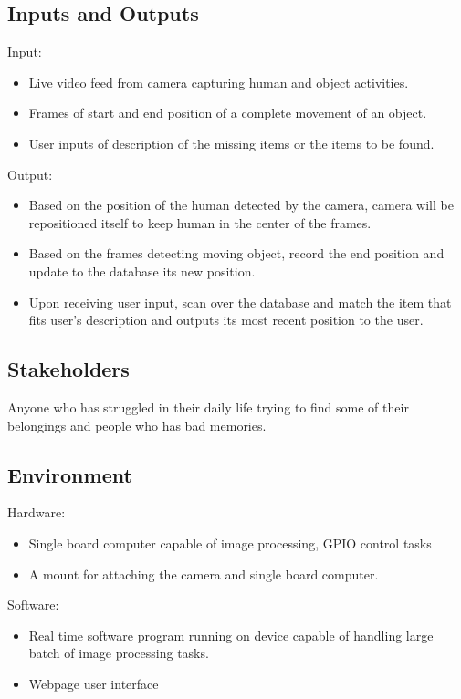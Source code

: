 \documentclass{article}
\begin{document}
\subsection{Inputs and Outputs}
Input:
\begin{itemize}
\item Live video feed from camera capturing human and object activities. 
\item Frames of start and end position of a complete movement of an object.
\item User inputs of description of the missing items or the items to be found.
\end{itemize}
Output:
\begin{itemize}
\item Based on the position of the human detected by the camera, camera will be repositioned itself to keep human in the center of the frames.
\item Based on the frames detecting moving object, record the end position and update to the database its new position.
\item Upon receiving user input, scan over the database and match the item that fits user's description and outputs its most recent position to the user.
\end{itemize}
\subsection{Stakeholders}
Anyone who has struggled in their daily life trying to find some of their belongings and people who has bad memories.
\subsection{Environment}

Hardware:
\begin{itemize}
\item Single board computer capable of image processing, GPIO control tasks
\item A mount for attaching the camera and single board computer.
\end{itemize}
Software:
\begin{itemize}
\item Real time software program running on device capable of handling large batch of image processing tasks.
\item Webpage user interface

\end{itemize}
\end{document}
